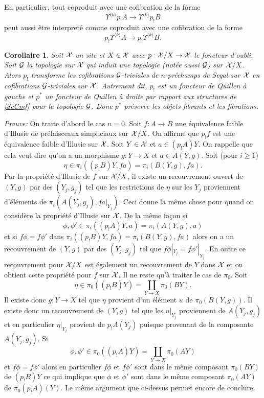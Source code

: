 \documentclass[12pt]{article}
\newtheorem{corollaire}[lemma]{Corollaire}
\newcommand{\Gg}{{\cal G}}
\newcommand{\Xx}{{\cal X}}
\begin{document}
En particulier, tout coproduit avec une cofibration de la forme
$$
\Upsilon ^{\langle k \rangle }p_!A  \rightarrow 
\Upsilon ^{\langle k \rangle } p_!B
$$
peut aussi \^etre interpret\'e comme coproduit avec une cofibration
de la forme 
$$
p_!\Upsilon ^{\langle k \rangle}
A \rightarrow  p_!\Upsilon ^{\langle k \rangle}B .
$$

\begin{corollaire}
\label{Gfibrestrict}
Soit $\Xx$ un site et $X\in \Xx$ avec $p: \Xx /X\rightarrow \Xx$ le foncteur
d'oubli. Soit $\Gg$ la topologie sur $\Xx$ qui induit une topologie (not\'ee
aussi $\Gg$) sur $\Xx /X$. Alors $p_!$ transforme les cofibrations
$\Gg$-triviales de $n$-pr\'echamps de Segal
sur $\Xx$ en cofibrations $\Gg$-triviales sur $\Xx $.
Autrement dit, $p_!$ est un foncteur de Quillen \`a gauche et $p^{\ast}$ un
foncteur de Quillen \`a droite par rapport aux structures de \ref{SeCmf} pour la
topologie $\Gg$. Donc $p^{\ast}$ pr\'eserve les objets fibrants et les
fibrations.
\end{corollaire}
{\em Preuve:}
On traite d'abord le cas $n=0$. Soit $f:A\rightarrow B$ une \'equivalence faible
d'Illusie de pr\'efaisceaux simpliciaux sur $\Xx /X$. On affirme que $p_!f$ est
une \'equivalence faible d'Illusie sur $\Xx$. Soit $Y\in \Xx$ et
$a\in (p_!A)Y$. On rappelle que cela veut dire qu'on a un morphisme
$g: Y\rightarrow X$ et $a\in A(Y,g)$. Soit (pour $i\geq 1$)
$$
\eta \in \pi _i((p_!B )Y, fa) = \pi _i(B(Y,g), fa).
$$
Par la propri\'et\'e d'Illusie de $f$ sur $\Xx / X$,
il existe un recouvrement ouvert de $(Y,g)$ par des $(Y_j,g_j)$ tel que 
les restrictions de $\eta$ sur les $Y_j$ proviennent d'\'el\'ements de
$\pi _i (A(Y_j,g_j), fa|_{Y_j})$. Ceci donne la m\^eme chose pour quand on
consid\`ere la propri\'et\'e d'Illusie sur $\Xx$. De la m\^eme fa\c{c}on
si 
$$
\phi ,\phi  '\in \pi _i((p_!A)Y, a) = \pi _i(A(Y,g), a)
$$
et si $f\phi = f\phi '$ dans 
$\pi _i((p_!B )Y, fa) = \pi _i(B(Y,g), fa)$ alors
on a un recouvrement de $(Y,g)$ par des $(Y_j,g_j)$ tel que  
$f\phi |_{Y_j} = f\phi '|_{Y_j}$.  En outre ce recouvrement pour $\Xx / X$ est
\'egalement un recouvrement de $Y$ dans $\Xx$ et on obtient cette propri\'et\'e
pour $f$ sur $\Xx$. Il ne reste qu'\`a traiter le cas de $\pi _0$. Soit 
$$
\eta \in \pi _0((p_!B)Y) = \coprod _{Y\rightarrow X}\pi _0(B Y).
$$
Il existe donc $g: Y\rightarrow X$ tel que $\eta $ provient d'un \'el\'ement
$u$ de $\pi _0(B(Y,g))$. Il existe donc un recouvrement de $(Y,g)$ tel que les
$u|_{Y_j}$ proviennent de $A(Y_j,g_j)$ et en particulier $\eta|_{Y_j}$ provient
de $p_!A(Y_j)$ puisque provenant de la  composante $A(Y_j,g_j)$.
Si 
$$
\phi , \phi '\in \pi _0((p_!A)Y) = \coprod _{Y\rightarrow X}\pi _0(A Y)
$$
et $f\phi =f\phi '$ alors en particulier $f\phi$ et $f\phi '$ sont dans le m\^eme
composant $\pi _0(B Y)$ de $(p_!B)Y$ ce qui implique que $\phi$ et $\phi'$
sont dans le m\^eme composant $\pi _0(AY)$ de $\pi _0(p_!A)(Y)$. Le m\^eme argument
que ci-dessus permet encore de conclure.
\end{document}
